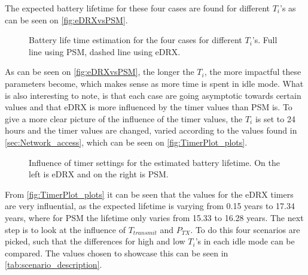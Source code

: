 The expected battery lifetime for these four cases are found for different $T_i$'s as can be seen on \autoref{fig:eDRXvsPSM}.

\begin{figure}[H]
\centering
{}
\resizebox{0.7\textwidth}{!}{
}
\caption{Battery life time estimation for the four cases for different $T_i$'s. Full line using PSM, dashed line using eDRX.}
\label{fig:eDRXvsPSM}
\end{figure}

As can be seen on \autoref{fig:eDRXvsPSM}, the longer the $T_i$, the more impactful these parameters become, which makes sense as more time is spent in idle mode. What is also interesting to note, is that each case are going asymptotic towards certain values and that eDRX is more influenced by the timer values than PSM is. To give a more clear picture of the influence of the timer values, the $T_i$ is set to 24 hours and the timer values are changed, varied according to the values found in \autoref{sec:Network_access}, which can be seen on \autoref{fig:TimerPlot_plots}.


\begin{figure}[H]
\centering
\begin{minipage}{0.48\textwidth}
\resizebox{\textwidth}{!}{
}
\end{minipage}
\hfill
\begin{minipage}{0.48\textwidth}
\resizebox{\textwidth}{!}{
}
\end{minipage}
\caption{Influence of timer settings for the estimated battery lifetime. On the left is eDRX and on the right is PSM.}
\label{fig:TimerPlot_plots}
\end{figure}

From \autoref{fig:TimerPlot_plots} it can be seen that the values for the eDRX timers are very influential, as the expected lifetime is varying from 0.15 years to 17.34 years, where for PSM the lifetime only varies from 15.33 to 16.28 years. The next step is to look at the influence of $T_{transmit}$ and $P_{TX}$. To do this four scenarios are picked, such that the differences for high and low $T_i$'s in each idle mode can be compared. The values chosen to showcase this can be seen in \autoref{tab:scenario_description}.


